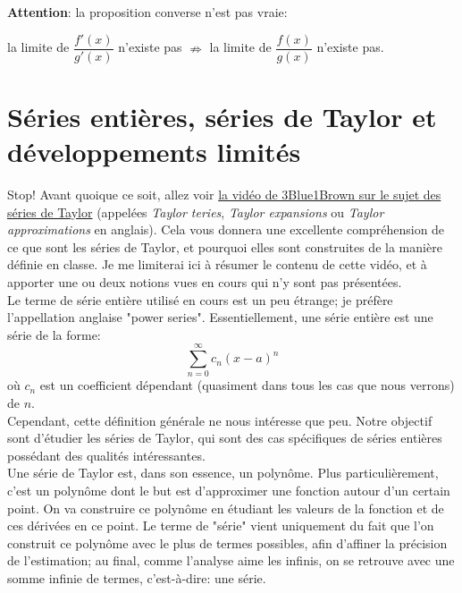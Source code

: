 \documentclass{article}
\begin{document}
\textbf{Attention}: la proposition converse n'est pas vraie:
\begin{center}
	la limite de \(\dfrac{f'(x)}{g'(x)}\) n'existe pas \(\nRightarrow\) la limite de \(\dfrac{f(x)}{g(x)}\) n'existe pas.
\end{center}


\section{Séries entières, séries de Taylor et développements limités}
Stop! Avant quoique ce soit, allez voir \href{https://www.youtube.com/watch?v=3d6DsjIBzJ4}{la vidéo de 3Blue1Brown sur le sujet des séries de Taylor} (appelées \emph{Taylor teries}, \emph{Taylor expansions} ou \emph{Taylor approximations} en anglais). Cela vous donnera une excellente compréhension de ce que sont les séries de Taylor, et pourquoi elles sont construites de la manière définie en classe. Je me limiterai ici à résumer le contenu de cette vidéo, et à apporter une ou deux notions vues en cours qui n'y sont pas présentées. \\

Le terme de série entière utilisé en cours est un peu étrange; je préfère l'appellation anglaise "power series". Essentiellement, une série entière est une série de la forme:
\begin{equation*}
	\sum_{n = 0}^\infty c_n (x-a)^n
\end{equation*}
où \(c_n\) est un coefficient dépendant (quasiment dans tous les cas que nous verrons) de \(n\). \\
Cependant, cette définition générale ne nous intéresse que peu. Notre objectif sont d'étudier les séries de Taylor, qui sont des cas spécifiques de séries entières possédant des qualités intéressantes. \\

Une série de Taylor est, dans son essence, un polynôme. Plus particulièrement, c'est un polynôme dont le but est d'approximer une fonction autour d'un certain point. On va construire ce polynôme en étudiant les valeurs de la fonction et de ces dérivées en ce point. Le terme de "série" vient uniquement du fait que l'on construit ce polynôme avec le plus de termes possibles, afin d'affiner la précision de l'estimation; au final, comme l'analyse aime les infinis, on se retrouve avec une somme infinie de termes, c'est-à-dire: une série. \\
\end{document}
